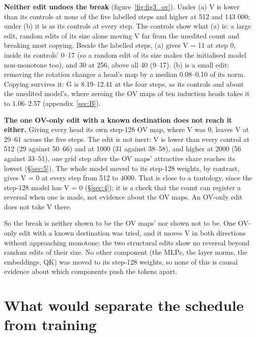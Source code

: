\documentclass[11pt]{article}
\begin{document}
\textbf{Neither edit undoes the break} (figure~\ref{fig:fig3_ov}). Under (a) V is lower than its controls at none of the five labelled steps and higher at 512 and 143 000; under (b) it is as its controls at every step. The controls show what (a) is: a large edit, random edits of its size alone moving V far from the unedited count and breaking most copying. Beside the labelled steps, (a) gives V = 11 at step 0, inside its controls' 0--17 (so a random edit of its size makes the initialised model non-monotone too), and 30 at 256, above all 40 (9--17). (b) is a small edit: removing the rotation changes a head's map by a median 0.08--0.10 of its norm. Copying survives it: G is 8.19--12.41 at the four steps, as its controls and about the unedited model's, where zeroing the OV maps of ten induction heads takes it to 1.06--2.57 (appendix~\ref{sec:B}).

\textbf{The one OV-only edit with a known destination does not reach it either.} Giving every head its own step-128 OV map, where V was 0, leaves V at 29--61 across the five steps. The edit is not inert: V is lower than every control at 512 (29 against 50--66) and at 1000 (31 against 38--58), and higher at 2000 (56 against 33--51), one grid step after the OV maps' attractive share reaches its lowest (\S\ref{sec:5}). The whole model moved to its step-128 weights, by contrast, gives V = 0 at every step from 512 to 4000. That is close to a tautology, since the step-128 model has V = 0 (\S\ref{sec:4}); it is a check that the count can register a reversal when one is made, not evidence about the OV maps. An OV-only edit does not take V there.

So the break is neither shown to be the OV maps' nor shown not to be. One OV-only edit with a known destination was tried, and it moves V in both directions without approaching monotone; the two structural edits show no reversal beyond random edits of their size. No other component (the MLPs, the layer norms, the embeddings, QK) was moved to its step-128 weights, so none of this is causal evidence about which components push the tokens apart.

\section{What would separate the schedule from training}\label{sec:7}
\end{document}

